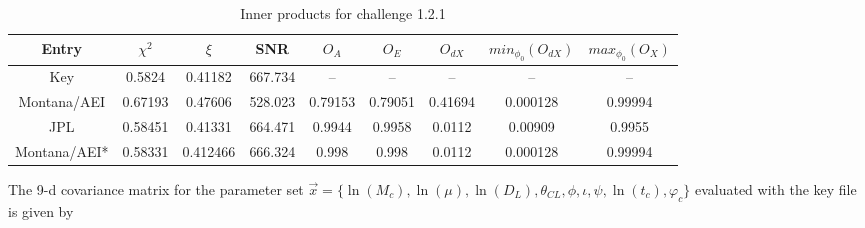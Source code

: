 \documentclass[11pt]{article}
\begin{document}
\begin{table}
\caption{\label{OlapsTable1.2.1} Inner products for challenge 1.2.1}
\begin{center}
\begin{tabular}{|c|c|c|c|c|c|c|c|c|}
\hline
Entry & $\chi^2$ & $\xi$ & SNR & $O_A$ & $O_E$ & $O_{dX}$ & $min_{\phi_0}(O_{dX})$ & $max_{\phi_0}(O_X)$\\
\hline
Key & 0.5824 & 0.41182 & 667.734 &  -- & -- & -- & -- & -- \\
Montana/AEI & 0.67193 & 0.47606 & 528.023 & 0.79153 & 0.79051 &
0.41694 & 0.000128 & 0.99994\\
JPL & 0.58451 & 0.41331 & 664.471 & 0.9944 & 0.9958 & 0.0112 &  0.00909 & 0.9955\\
Montana/AEI* & 0.58331 & 0.412466 & 666.324 & 0.998 & 0.998 & 0.0112 & 0.000128 & 0.99994 \\
\hline
\end{tabular}
\end{center}
\end{table}

The 9-d covariance matrix for the parameter set $\vec{x}=\{\ln(M_{c}), \ln(\mu), \ln(D_{L}), \theta_{CL}, \phi, \iota, \psi, \ln(t_{c}), \varphi_{c}\}$ evaluated with the key file is given by
\end{document}

